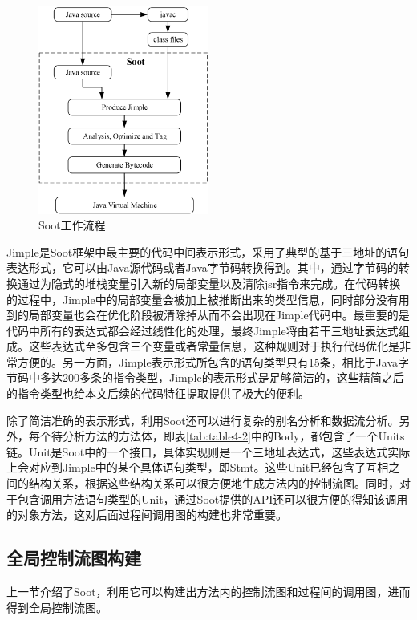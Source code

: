 \begin{figure}
	\centering
	\includegraphics[width=0.50\textwidth]{figures/Soot4-4}
	\caption{Soot工作流程}\label{fig:figure4-4}
\end{figure}

Jimple是Soot框架中最主要的代码中间表示形式，采用了典型的基于三地址的语句表达形式，它可以由Java源代码或者Java字节码转换得到。其中，通过字节码的转换通过为隐式的堆栈变量引入新的局部变量以及清除jsr指令来完成。在代码转换的过程中，Jimple中的局部变量会被加上被推断出来的类型信息，同时部分没有用到的局部变量也会在优化阶段被清除掉从而不会出现在Jimple代码中。最重要的是代码中所有的表达式都会经过线性化的处理，最终Jimple将由若干三地址表达式组成。这些表达式至多包含三个变量或者常量信息，这种规则对于执行代码优化是非常方便的。另一方面，Jimple表示形式所包含的语句类型只有15条，相比于Java字节码中多达200多条的指令类型，Jimple的表示形式是足够简洁的，这些精简之后的指令类型也给本文后续的代码特征提取提供了极大的便利。

除了简洁准确的表示形式，利用Soot还可以进行复杂的别名分析和数据流分析。另外，每个待分析方法的方法体，即表\ref{tab:table4-2}中的Body，都包含了一个Units链。Unit是Soot中的一个接口，具体实现则是一个三地址表达式，这些表达式实际上会对应到Jimple中的某个具体语句类型，即Stmt。这些Unit已经包含了互相之间的结构关系，根据这些结构关系可以很方便地生成方法内的控制流图。同时，对于包含调用方法语句类型的Unit，通过Soot提供的API还可以很方便的得知该调用的对象方法，这对后面过程间调用图的构建也非常重要。

\subsection{全局控制流图构建}
上一节介绍了Soot，利用它可以构建出方法内的控制流图和过程间的调用图，进而得到全局控制流图。

